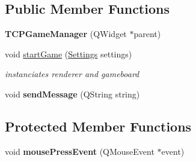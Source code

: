 \subsection*{Public Member Functions}
\begin{DoxyCompactItemize}
\item 
\hypertarget{class_t_c_p_game_manager_a0a83c4efd02332883aaa7935b480ec2c}{{\bfseries T\-C\-P\-Game\-Manager} (Q\-Widget $\ast$parent)}\label{class_t_c_p_game_manager_a0a83c4efd02332883aaa7935b480ec2c}

\item 
\hypertarget{class_t_c_p_game_manager_a7d4415253458e80a05314f91a0879fd0}{void \hyperlink{class_t_c_p_game_manager_a7d4415253458e80a05314f91a0879fd0}{start\-Game} (\hyperlink{struct_settings}{Settings} settings)}\label{class_t_c_p_game_manager_a7d4415253458e80a05314f91a0879fd0}

\begin{DoxyCompactList}\small\item\em instanciates renderer and gameboard \end{DoxyCompactList}\item 
\hypertarget{class_t_c_p_game_manager_a518a1a16b52b9ede6474749f59f203b1}{void {\bfseries send\-Message} (Q\-String string)}\label{class_t_c_p_game_manager_a518a1a16b52b9ede6474749f59f203b1}

\end{DoxyCompactItemize}
\subsection*{Protected Member Functions}
\begin{DoxyCompactItemize}
\item 
\hypertarget{class_t_c_p_game_manager_af76ec973ba1c3e7f58ac979fffccb85f}{void {\bfseries mouse\-Press\-Event} (Q\-Mouse\-Event $\ast$event)}\label{class_t_c_p_game_manager_af76ec973ba1c3e7f58ac979fffccb85f}

\end{DoxyCompactItemize}
